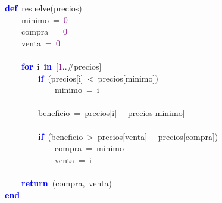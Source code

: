 \noindent
\mbox{}\textbf{\textcolor{Blue}{def}}\ resuelve\textcolor{BrickRed}{(}precios\textcolor{BrickRed}{)} \\
\mbox{}\ \ \ \ minimo\ \textcolor{BrickRed}{=}\ \textcolor{Purple}{0} \\
\mbox{}\ \ \ \ compra\ \textcolor{BrickRed}{=}\ \textcolor{Purple}{0} \\
\mbox{}\ \ \ \ venta\ \textcolor{BrickRed}{=}\ \textcolor{Purple}{0} \\
\mbox{} \\
\mbox{}\ \ \ \ \textbf{\textcolor{Blue}{for}}\ i\ \textbf{\textcolor{Blue}{in}}\ \textcolor{BrickRed}{[}\textcolor{Purple}{1}\textcolor{BrickRed}{..}\#precios\textcolor{BrickRed}{]} \\
\mbox{}\ \ \ \ \ \ \ \ \textbf{\textcolor{Blue}{if}}\ \textcolor{BrickRed}{(}precios\textcolor{BrickRed}{[}i\textcolor{BrickRed}{]}\ \textcolor{BrickRed}{\textless{}}\ precios\textcolor{BrickRed}{[}minimo\textcolor{BrickRed}{]}\textcolor{BrickRed}{)} \\
\mbox{}\ \ \ \ \ \ \ \ \ \ \ \ minimo\ \textcolor{BrickRed}{=}\ i \\
\mbox{} \\
\mbox{}\ \ \ \ \ \ \ \ beneficio\ \textcolor{BrickRed}{=}\ precios\textcolor{BrickRed}{[}i\textcolor{BrickRed}{]}\ \textcolor{BrickRed}{-}\ precios\textcolor{BrickRed}{[}minimo\textcolor{BrickRed}{]} \\
\mbox{} \\
\mbox{}\ \ \ \ \ \ \ \ \textbf{\textcolor{Blue}{if}}\ \textcolor{BrickRed}{(}beneficio\ \textcolor{BrickRed}{\textgreater{}}\ precios\textcolor{BrickRed}{[}venta\textcolor{BrickRed}{]}\ \textcolor{BrickRed}{-}\ precios\textcolor{BrickRed}{[}compra\textcolor{BrickRed}{])} \\
\mbox{}\ \ \ \ \ \ \ \ \ \ \ \ compra\ \textcolor{BrickRed}{=}\ minimo \\
\mbox{}\ \ \ \ \ \ \ \ \ \ \ \ venta\ \textcolor{BrickRed}{=}\ i \\
\mbox{} \\
\mbox{}\ \ \ \ \textbf{\textcolor{Blue}{return}}\ \textcolor{BrickRed}{(}compra\textcolor{BrickRed}{,}\ venta\textcolor{BrickRed}{)} \\
\mbox{}\textbf{\textcolor{Blue}{end}} \\
\mbox{}
